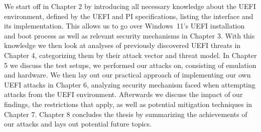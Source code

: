 We start off in Chapter 2 by introducing all necessary knowledge about the \ac{UEFI} environment, defined by the \ac{UEFI} and \ac{PI} specifications, listing the interface and its implementation.
This allows us to go over Windows~11's \ac{UEFI} installation and boot process as well as relevant security mechanisms in Chapter 3.
With this knowledge we then look at analyses of previously discovered \ac{UEFI} threats in Chapter 4, categorizing them by their attack vector and threat model.
In Chapter 5 we discuss the test setups, we performed our attacks on, consisting of emulation and hardware.
We then lay out our practical approach of implementing our own \ac{UEFI} attacks in Chapter 6, analyzing security mechanism faced when attempting attacks from the UEFI environment.
Afterwards we discuss the impact of our findings, the restrictions that apply, as well as potential mitigation techniques in Chapter 7.
Chapter 8 concludes the thesis by summarizing the achievements of our attacks and lays out potential future topics.